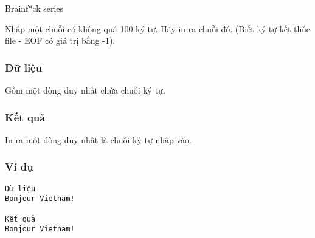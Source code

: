 

       Brainf*ck series     

   Nhập một chuỗi có không quá 100 ký tự. Hãy in ra chuỗi đó. (Biết ký tự kết thúc file - EOF có giá trị bằng -1).  

\subsubsection{   Dữ liệu  }

   Gồm một dòng duy nhất chứa chuỗi ký tự.  

\subsubsection{   Kết quả  }

   In ra một dòng duy nhất là chuỗi ký tự nhập vào.  

\subsubsection{   Ví dụ  }
\begin{verbatim}
Dữ liệu
Bonjour Vietnam!

Kết quả 
Bonjour Vietnam!
\end{verbatim}